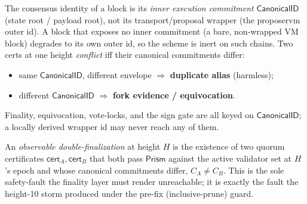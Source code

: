 \begin{definition}
\label{def:canonical-commitment}
The consensus identity of a block is its \emph{inner execution
commitment} $\mathsf{CanonicalID}$ (state root / payload root), not its
transport/proposal wrapper (the proposervm outer id). A block that
exposes no inner commitment (a bare, non-wrapped VM block) degrades to
its own outer id, so the scheme is inert on such chains. Two certs at
one height \emph{conflict} iff their canonical commitments differ:
\begin{itemize}[nosep]
  \item same $\mathsf{CanonicalID}$, different envelope $\Rightarrow$
        \textbf{duplicate alias} (harmless);
  \item different $\mathsf{CanonicalID}$ $\Rightarrow$ \textbf{fork
        evidence / equivocation}.
\end{itemize}
Finality, equivocation, vote-locks, and the sign gate are all keyed on
$\mathsf{CanonicalID}$; a locally derived wrapper id may never reach any
of them.
\end{definition}

\begin{definition}
\label{def:double-final}
An \emph{observable double-finalization} at height $H$ is the existence
of two quorum certificates $\mathsf{cert}_A, \mathsf{cert}_B$ that both
pass $\mathsf{Prism}$ against the active validator set at $H$'s epoch and
whose canonical commitments differ,
$C_A \ne C_B$. This is the sole safety-fault the finality layer must
render unreachable; it is exactly the fault the height-10 storm
produced under the pre-fix (inclusive-prune) guard.
\end{definition}
